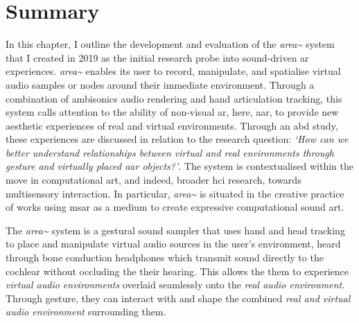 \clearpage



\section{Summary}\label{sec: area-summary}
In this chapter, I outline the development and evaluation of the \textit{area\textasciitilde{}} system that I created in 2019 as the initial research probe into sound-driven \gls{ar} experiences. \textit{area\textasciitilde{}} enables its user to record, manipulate, and spatialise virtual audio samples or nodes around their immediate environment. Through a combination of ambisonics audio rendering and hand articulation tracking, this system calls attention to the ability of non-visual \gls{ar}, here, \gls{aar}, to provide new aesthetic experiences of real and virtual environments.
Through an \gls{abd} study, these experiences are discussed in relation to the research question: \textit{`How can we better understand relationships between virtual and real environments through gesture and virtually placed \gls{aar} objects?'}. The system is contextualised within the move in computational art, and indeed, broader \gls{hci} research, towards multisensory interaction. In particular, \textit{area\textasciitilde{}} is situated in the creative practice of works using \gls{msar} as a medium to create expressive computational sound art.

The \textit{area\textasciitilde{}} system is a gestural sound sampler that uses hand and head tracking to place and manipulate virtual audio sources in the user's environment, heard through bone conduction headphones which transmit sound directly to the cochlear without occluding the their hearing. This allows the them to experience \textit{virtual audio environments} overlaid seamlessly onto the \textit{real audio environment}. Through gesture, they can interact with and shape the combined \textit{real and virtual audio environment} surrounding them.

